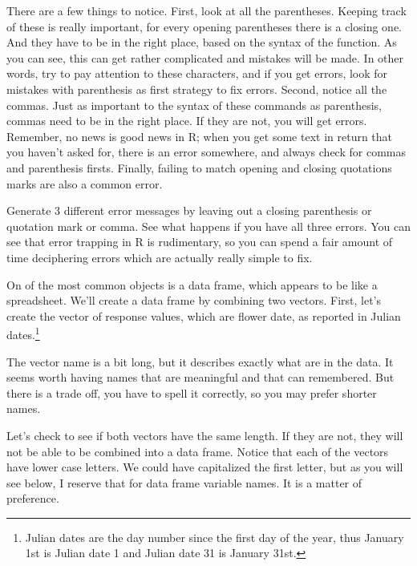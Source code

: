 \documentclass{tufte-handout}\usepackage[]{graphicx}\usepackage[]{xcolor}
\begin{document}
There are a few things to notice. First, look at all the parentheses. Keeping track of these is really important, for every opening parentheses there is a closing one. And they have to be in the right place, based on the syntax of the function. As you can see, this can get rather complicated and mistakes will be made. In other words, try to pay attention to these characters, and if you get errors, look for mistakes with parenthesis as first strategy to fix errors. Second, notice all the commas. Just as important to the syntax of these commands as parenthesis, commas need to be in the right place. If they are not, you will get errors. Remember, no news is good news in R; when you get some text in return that you haven't asked for, there is an error somewhere, and always check for commas and parenthesis firsts. Finally, failing to match opening and closing quotations marks are also a common error. 

Generate 3 different error messages by leaving out a closing parenthesis or quotation mark or comma. See what happens if you have all three errors. You can see that error trapping in R is rudimentary, so you can spend a fair amount of time deciphering errors which are actually really simple to fix. 

On of the most common objects is a data frame, which appears to be like a spreadsheet. We'll create a data frame by combining two vectors. First, let's create the vector of response values, which are flower date, as reported in Julian dates.\footnote[][-1.1cm]{Julian dates are the day number since the first day of the year, thus January 1st is Julian date 1 and Julian date 31 is January 31st.}



\begin{fullwidth}

\end{fullwidth}



The vector name is a bit long, but it describes exactly what are in the data. It seems worth having names that are meaningful and that can remembered. But there is a trade off, you have to spell it correctly, so you may prefer shorter names. 

Let's check to see if both vectors have the same length. If they are not, they will not be able to be combined into a data frame. Notice that each of the vectors have lower case letters. We could have capitalized the first letter, but as you will see below, I reserve that for data frame variable names. It is a matter of preference.
\end{document}
